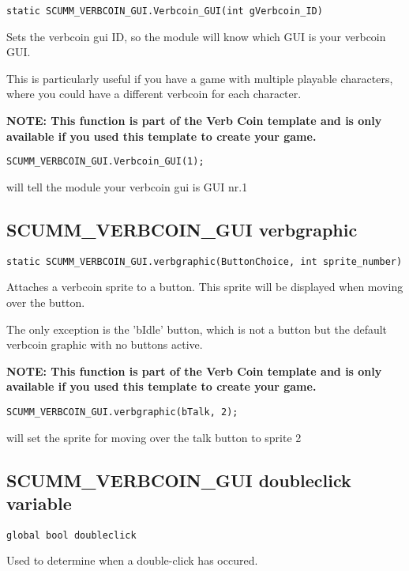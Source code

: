 \begin{verbatim}
static SCUMM_VERBCOIN_GUI.Verbcoin_GUI(int gVerbcoin_ID)
\end{verbatim}
Sets the verbcoin gui ID, so the module will know which GUI is your verbcoin GUI.

This is particularly useful if you have a game with multiple playable characters,
where you could have a different verbcoin for each character.

\bf{NOTE:} This function is part of the Verb Coin template and is only available if
you used this template to create your game.

\begin{verbatim}
SCUMM_VERBCOIN_GUI.Verbcoin_GUI(1);
\end{verbatim}

will tell the module your verbcoin gui is GUI nr.1


\subsection{SCUMM_VERBCOIN_GUI verbgraphic}\label{SCUMM_VERBCOIN_GUI.verbgraphic}%

\begin{verbatim}
static SCUMM_VERBCOIN_GUI.verbgraphic(ButtonChoice, int sprite_number)
\end{verbatim}
Attaches a verbcoin sprite to a button. This sprite will be displayed when
moving over the button.

The only exception is the 'bIdle' button, which is not a button but the default
verbcoin graphic with no buttons active.

\bf{NOTE:} This function is part of the Verb Coin template and is only available if
you used this template to create your game.

\begin{verbatim}
SCUMM_VERBCOIN_GUI.verbgraphic(bTalk, 2);
\end{verbatim}

will set the sprite for moving over the talk button to sprite 2


\subsection{SCUMM_VERBCOIN_GUI doubleclick variable}\label{SCUMM_VERBCOIN_GUI.doubleclick}%

\begin{verbatim}
global bool doubleclick
\end{verbatim}
Used to determine when a double-click has occured.

